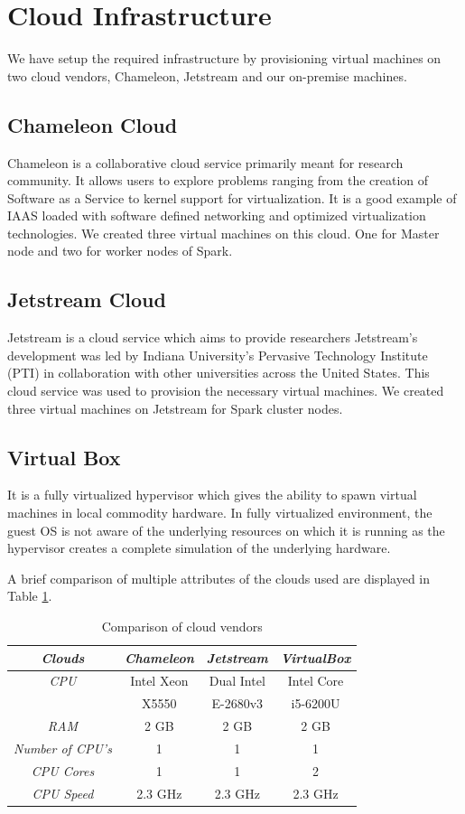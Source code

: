 \documentclass[9pt,twocolumn,twoside]{../../styles/osajnl}
\begin{document}
\section{Cloud Infrastructure}
We have setup the required infrastructure by provisioning virtual machines on two cloud vendors, Chameleon, Jetstream and our on-premise machines.
\subsection{Chameleon Cloud}
Chameleon  is a collaborative cloud service primarily meant for research community. It allows users to explore problems ranging from the creation of Software as a Service to kernel support for virtualization. It is a good example of IAAS loaded with software defined networking and optimized virtualization technologies. We created three virtual machines on this cloud. One for Master node and two for worker nodes of Spark.

\subsection{Jetstream Cloud}
Jetstream is a cloud service which aims to provide researchers Jetstream’s development was led by Indiana University’s Pervasive Technology Institute (PTI) in collaboration with other universities \cite{www-jetstream} across the United States. This cloud service was used to provision the necessary virtual machines. We created three virtual machines on Jetstream for Spark cluster nodes.

\subsection{Virtual Box}
It is a fully virtualized hypervisor which gives the ability to spawn virtual machines in local commodity hardware. In fully virtualized environment, the guest OS  is not aware of the underlying  resources on which it is running as the hypervisor creates a complete simulation of the underlying hardware. 

A brief comparison of multiple attributes of the clouds used are displayed in Table \ref{table:clouds}.

\begin{table}[h!]
\centering
\caption{Comparison of cloud vendors}
 \begin{tabular}{|c|c c c|} 
 \hline
 \textit{Clouds} & \textit{Chameleon} & \textit{Jetstream} & \textit{VirtualBox}  \\ 
 \hline
 \hline 
 \textit{CPU} & Intel Xeon & Dual Intel & Intel Core  \\ 
 & X5550 & E-2680v3 & i5-6200U\\
 \hline 
 \textit{RAM} & 2 GB & 2 GB & 2 GB \\ 
\hline 
\textit{Number of CPU's} & 1 & 1 & 1 \\
\hline 
\textit{CPU Cores} & 1 & 1 & 2\\
\hline 
\textit{CPU Speed} & 2.3 GHz & 2.3 GHz & 2.3 GHz\\
\hline 
\end{tabular}
\label{table:clouds}
\end{table}
\end{document}
